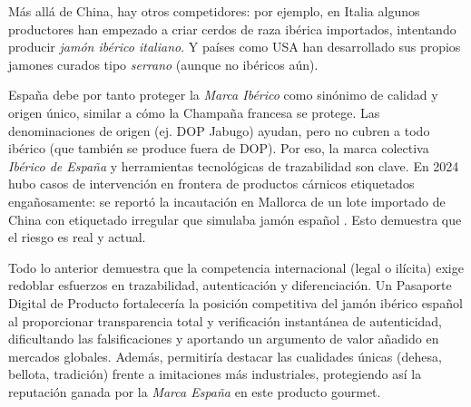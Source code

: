 Más allá de China, hay otros competidores: por ejemplo, en Italia algunos productores han empezado a criar cerdos de raza ibérica importados, intentando producir \textit{jamón ibérico italiano}. Y países como USA han desarrollado sus propios jamones curados tipo \textit{serrano} (aunque no ibéricos aún).

España debe por tanto proteger la \textit{Marca Ibérico} como sinónimo de calidad y origen único, similar a cómo la Champaña francesa se protege. Las denominaciones de origen (ej. DOP Jabugo) ayudan, pero no cubren a todo ibérico (que también se produce fuera de DOP). Por eso, la marca colectiva \textit{Ibérico de España} y herramientas tecnológicas de trazabilidad son clave. En 2024 hubo casos de intervención en frontera de productos cárnicos etiquetados engañosamente: se reportó la incautación en Mallorca de un lote importado de China con etiquetado irregular que simulaba jamón español \cite{depares_china_2024}. Esto demuestra que el riesgo es real y actual.

Todo lo anterior demuestra que la competencia internacional (legal o ilícita) exige redoblar esfuerzos en trazabilidad, autenticación y diferenciación. Un Pasaporte Digital de Producto fortalecería la posición competitiva del jamón ibérico español al proporcionar transparencia total y verificación instantánea de autenticidad, dificultando las falsificaciones y aportando un argumento de valor añadido en mercados globales. Además, permitiría destacar las cualidades únicas (dehesa, bellota, tradición) frente a imitaciones más industriales, protegiendo así la reputación ganada por la \textit{Marca España} en este producto gourmet.


